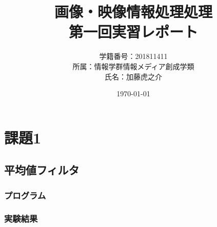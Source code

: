 \documentclass[a4paper,10pt,uplatex,dvipdfmx]{jsarticle}
\title{画像・映像情報処理処理\\ \huge 第一回実習レポート}
\author{学籍番号：201811411\\ 所属：情報学群情報メディア創成学類\\ 氏名：加藤虎之介}
\date{\today}
\begin{document}
\maketitle
\section{課題1}
\subsection{平均値フィルタ}
\subsubsection{プログラム}


\subsubsection{実験結果}
\end{document}
